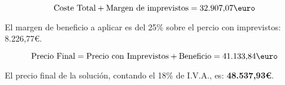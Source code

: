 $$
\mbox{Coste Total} + \mbox{Margen de imprevistos} = \mbox{32.907,07\euro}
$$

El margen de beneficio a aplicar es del 25\% sobre el percio con imprevistos: 8.226,77\euro.

$$
	\mbox{Precio Final} = \mbox{Precio con Imprevistos} + \mbox{Beneficio} = \mbox{41.133,84\euro}
$$

El precio final de la solución, contando el 18\% de I.V.A., es: {\large \textbf{48.537,93\euro}}.








